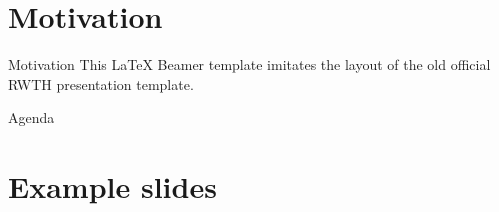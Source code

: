 
\section*{Motivation}



\begin{frame}{Motivation}
  This \LaTeX{} Beamer template imitates the layout of the old official RWTH presentation template.
\end{frame}

\begin{frame}[t]{Agenda}
  \tableofcontents[hideallsubsections]
\end{frame}

\section{Example slides}

